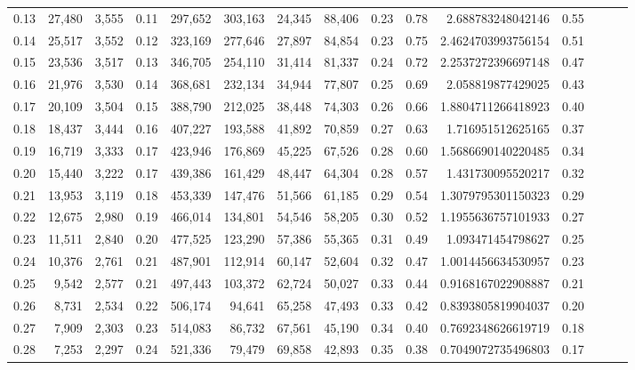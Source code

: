 \begin{tabular}{rrrrrrrrrrrrrrr}
0.13 &  27,480 &  3,555 &  0.11 &  297,652 &  303,163 &   24,345 &   88,406 &  0.23 &  0.78 &       2.688783248042146 &      0.55 \\
0.14 &  25,517 &  3,552 &  0.12 &  323,169 &  277,646 &   27,897 &   84,854 &  0.23 &  0.75 &      2.4624703993756154 &      0.51 \\
0.15 &  23,536 &  3,517 &  0.13 &  346,705 &  254,110 &   31,414 &   81,337 &  0.24 &  0.72 &      2.2537272396697148 &      0.47 \\
0.16 &  21,976 &  3,530 &  0.14 &  368,681 &  232,134 &   34,944 &   77,807 &  0.25 &  0.69 &       2.058819877429025 &      0.43 \\
0.17 &  20,109 &  3,504 &  0.15 &  388,790 &  212,025 &   38,448 &   74,303 &  0.26 &  0.66 &      1.8804711266418923 &      0.40 \\
0.18 &  18,437 &  3,444 &  0.16 &  407,227 &  193,588 &   41,892 &   70,859 &  0.27 &  0.63 &       1.716951512625165 &      0.37 \\
0.19 &  16,719 &  3,333 &  0.17 &  423,946 &  176,869 &   45,225 &   67,526 &  0.28 &  0.60 &      1.5686690140220485 &      0.34 \\
0.20 &  15,440 &  3,222 &  0.17 &  439,386 &  161,429 &   48,447 &   64,304 &  0.28 &  0.57 &       1.431730095520217 &      0.32 \\
0.21 &  13,953 &  3,119 &  0.18 &  453,339 &  147,476 &   51,566 &   61,185 &  0.29 &  0.54 &      1.3079795301150323 &      0.29 \\
0.22 &  12,675 &  2,980 &  0.19 &  466,014 &  134,801 &   54,546 &   58,205 &  0.30 &  0.52 &      1.1955636757101933 &      0.27 \\
0.23 &  11,511 &  2,840 &  0.20 &  477,525 &  123,290 &   57,386 &   55,365 &  0.31 &  0.49 &       1.093471454798627 &      0.25 \\
0.24 &  10,376 &  2,761 &  0.21 &  487,901 &  112,914 &   60,147 &   52,604 &  0.32 &  0.47 &      1.0014456634530957 &      0.23 \\
0.25 &   9,542 &  2,577 &  0.21 &  497,443 &  103,372 &   62,724 &   50,027 &  0.33 &  0.44 &      0.9168167022908887 &      0.21 \\
0.26 &   8,731 &  2,534 &  0.22 &  506,174 &   94,641 &   65,258 &   47,493 &  0.33 &  0.42 &      0.8393805819904037 &      0.20 \\
0.27 &   7,909 &  2,303 &  0.23 &  514,083 &   86,732 &   67,561 &   45,190 &  0.34 &  0.40 &      0.7692348626619719 &      0.18 \\
0.28 &   7,253 &  2,297 &  0.24 &  521,336 &   79,479 &   69,858 &   42,893 &  0.35 &  0.38 &      0.7049072735496803 &      0.17 \\

\end{tabular}
